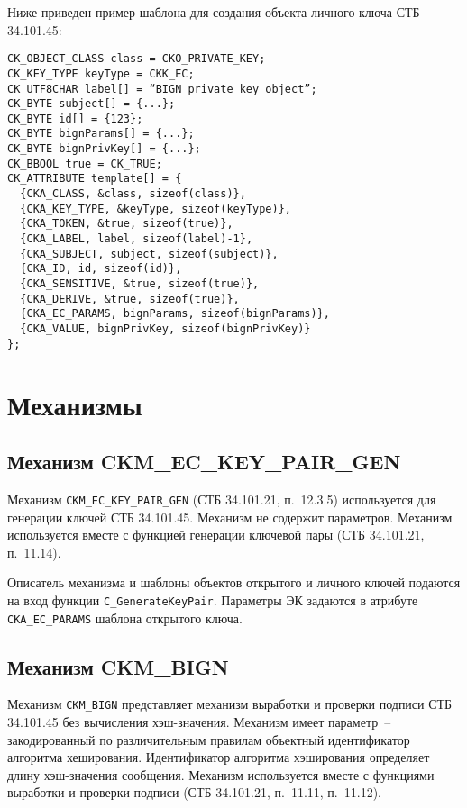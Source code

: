 Ниже приведен пример шаблона для создания объекта личного ключа СТБ 34.101.45:
\begin{verbatim}
CK_OBJECT_CLASS class = CKO_PRIVATE_KEY;
CK_KEY_TYPE keyType = CKK_EC;
CK_UTF8CHAR label[] = “BIGN private key object”;
CK_BYTE subject[] = {...};
CK_BYTE id[] = {123};
CK_BYTE bignParams[] = {...};
CK_BYTE bignPrivKey[] = {...};
CK_BBOOL true = CK_TRUE;
CK_ATTRIBUTE template[] = {
  {CKA_CLASS, &class, sizeof(class)},
  {CKA_KEY_TYPE, &keyType, sizeof(keyType)},
  {CKA_TOKEN, &true, sizeof(true)},
  {CKA_LABEL, label, sizeof(label)-1},
  {CKA_SUBJECT, subject, sizeof(subject)},
  {CKA_ID, id, sizeof(id)},
  {CKA_SENSITIVE, &true, sizeof(true)},
  {CKA_DERIVE, &true, sizeof(true)},
  {CKA_EC_PARAMS, bignParams, sizeof(bignParams)},
  {CKA_VALUE, bignPrivKey, sizeof(bignPrivKey)}
};
\end{verbatim}

\section{Механизмы}

\subsection{Механизм CKM\_EC\_KEY\_PAIR\_GEN}
Механизм \verb|CKM_EC_KEY_PAIR_GEN| (СТБ 34.101.21, п.~12.3.5)
используется для генерации ключей СТБ 34.101.45.
Механизм не содержит параметров.
Механизм используется вместе с функцией генерации ключевой
пары (СТБ 34.101.21, п.~11.14).

Описатель механизма и шаблоны объектов открытого и личного
ключей подаются на вход функции \verb|C_GenerateKeyPair|.
Параметры ЭК задаются в атрибуте \verb|CKA_EC_PARAMS|
шаблона открытого ключа.

\subsection{Механизм CKM\_BIGN}

Механизм
\verb|CKM_BIGN| представляет механизм выработки и проверки
подписи СТБ 34.101.45 без вычисления хэш-значения.
Механизм имеет параметр~-- закодированный по различительным
правилам объектный идентификатор алгоритма хеширования. 
Идентификатор алгоритма хэширования определяет длину
хэш-значения сообщения.
Механизм используется вместе с функциями выработки и
проверки подписи (СТБ 34.101.21, п.~11.11, п.~11.12).

